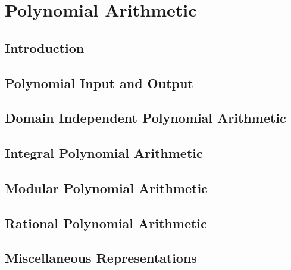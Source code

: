 \documentclass{report}
\begin{document}



\chapter{Polynomial Arithmetic}
\label{c:PA}

\section{Introduction}
\label{c:PA s:I}



\section{Polynomial Input and Output}
\label{cPAsPIO.tex}



\section{Domain Independent Polynomial Arithmetic}
\label{c:PA s:DIPA}



\section{Integral Polynomial Arithmetic}
\label{c:PA s:IPA}



\section{Modular Polynomial Arithmetic}
\label{c:PA s:MPA}



\section{Rational Polynomial Arithmetic}
\label{c:PA s:RPA}



\section{Miscellaneous Representations}
\label{c:PA s:MR}
\end{document}
